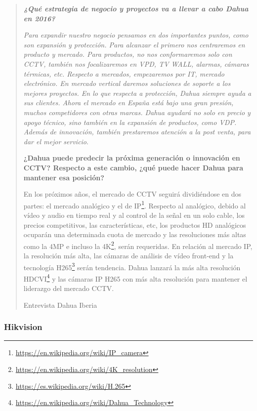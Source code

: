 \begin{quote}
{\itshape
\textbf{¿Qué estrategia de negocio y proyectos va a llevar a cabo Dahua en 2016?}

\textit{Para expandir nuestro negocio pensamos en dos importantes puntos, como son expansión y protección. Para alcanzar el primero nos centraremos en producto y mercado. Para productos, no nos conformaremos solo con CCTV, también nos focalizaremos en \acs{VPD}, \acs{TV WALL}, alarmas, cámaras térmicas, etc. Respecto a mercados, empezaremos por \acs{IT}, mercado electrónico. En mercado vertical daremos soluciones de soporte a los mejores proyectos. En lo que respecta a protección, Dahua
siempre ayuda a sus clientes. Ahora el mercado en España está bajo una gran presión, muchos competidores con otras marcas. Dahua ayudará no solo en precio y apoyo técnico, sino también
en la expansión de productos, como VDP. Además de innovación, también prestaremos atención a la post venta, para dar el mejor servicio}.

\textbf{¿Dahua puede predecir la próxima generación o innovación en CCTV? Respecto a este cambio,
¿qué puede hacer Dahua para mantener esa posición?}

En los próximos años, el mercado de \acs{CCTV} seguirá dividiéndose en dos partes:
el mercado analógico y el de IP\footnote{\url{https://en.wikipedia.org/wiki/IP_camera}}. Respecto al analógico, debido al vídeo y audio en tiempo real y al control de la señal en un solo cable, los precios competitivos, las características, etc, los productos \acs{HD} analógicos ocuparán
una determinada cuota de mercado y las resoluciones más altas como la 4MP e incluso la 4K\footnote{\url{https://en.wikipedia.org/wiki/4K_resolution}}, serán requeridas. En relación al mercado IP, la resolución más alta, las cámaras de análisis de vídeo front-end y la tecnología H265\footnote{\url{https://es.wikipedia.org/wiki/H.265}} serán tendencia. Dahua lanzará la más alta resolución \acs{HDCVI}\footnote{\url{https://en.wikipedia.org/wiki/Dahua_Technology}} y las cámaras IP H265
con más alta resolución para mantener el liderazgo del mercado \acs{CCTV}.
}

\par\nointerlineskip\noindent\hfill Entrevista Dahua Iberia~\cite{DahuaIberia}
\end{quote}

\subsubsection{Hikvision}

